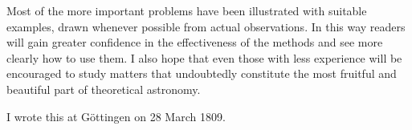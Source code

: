 Most of the more important problems have been illustrated with suitable
examples, drawn whenever possible from actual observations. In this way readers will gain greater confidence in the effectiveness of the methods and see more clearly how to use them. I also hope that even those with less experience will be encouraged to study matters that undoubtedly constitute the most fruitful and beautiful part of theoretical astronomy.

I wrote this at Göttingen on 28 March 1809.
